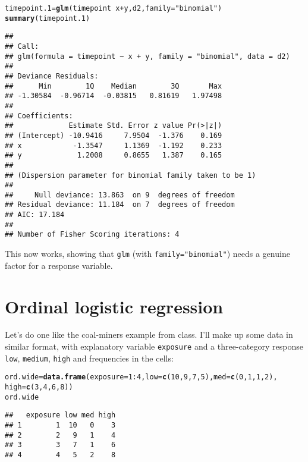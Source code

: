 \documentclass{article}\usepackage[]{graphicx}\usepackage[]{color}
\makeatletter
\newcommand{\hlnum}[1]{\textcolor[rgb]{0.686,0.059,0.569}{#1}}%
\newcommand{\hlstr}[1]{\textcolor[rgb]{0.192,0.494,0.8}{#1}}%
\newcommand{\hlopt}[1]{\textcolor[rgb]{0,0,0}{#1}}%
\newcommand{\hlstd}[1]{\textcolor[rgb]{0.345,0.345,0.345}{#1}}%
\newcommand{\hlkwb}[1]{\textcolor[rgb]{0.69,0.353,0.396}{#1}}%
\newcommand{\hlkwc}[1]{\textcolor[rgb]{0.333,0.667,0.333}{#1}}%
\newcommand{\hlkwd}[1]{\textcolor[rgb]{0.737,0.353,0.396}{\textbf{#1}}}%
\newenvironment{kframe}{%
 \def\at@end@of@kframe{}%
 \ifinner\ifhmode%
  \def\at@end@of@kframe{\end{minipage}}%
  \begin{minipage}{\columnwidth}%
 \fi\fi%
 \def\FrameCommand##1{\hskip\@totalleftmargin \hskip-\fboxsep
 \colorbox{shadecolor}{##1}\hskip-\fboxsep
     \hskip-\linewidth \hskip-\@totalleftmargin \hskip\columnwidth}%
 \MakeFramed {\advance\hsize-\width
   \@totalleftmargin\z@ \linewidth\hsize
   \@setminipage}}%
 {\par\unskip\endMakeFramed%
 \at@end@of@kframe}
\newenvironment{knitrout}{}{} %
\makeatother
\begin{document}
\begin{knitrout}
\color{fgcolor}\begin{kframe}
\begin{alltt}
\hlstd{timepoint.1}\hlkwb{=}\hlkwd{glm}\hlstd{(timepoint}\hlopt{~}\hlstd{x}\hlopt{+}\hlstd{y,d2,}\hlkwc{family}\hlstd{=}\hlstr{"binomial"}\hlstd{)}
\hlkwd{summary}\hlstd{(timepoint.1)}
\end{alltt}
\begin{verbatim}
## 
## Call:
## glm(formula = timepoint ~ x + y, family = "binomial", data = d2)
## 
## Deviance Residuals: 
##      Min        1Q    Median        3Q       Max  
## -1.30584  -0.96714  -0.03815   0.81619   1.97498  
## 
## Coefficients:
##             Estimate Std. Error z value Pr(>|z|)
## (Intercept) -10.9416     7.9504  -1.376    0.169
## x            -1.3547     1.1369  -1.192    0.233
## y             1.2008     0.8655   1.387    0.165
## 
## (Dispersion parameter for binomial family taken to be 1)
## 
##     Null deviance: 13.863  on 9  degrees of freedom
## Residual deviance: 11.184  on 7  degrees of freedom
## AIC: 17.184
## 
## Number of Fisher Scoring iterations: 4
\end{verbatim}
\end{kframe}
\end{knitrout}

This now works, showing that \texttt{glm} (with
\texttt{family="binomial"}) needs a genuine factor for a response variable.

\section{Ordinal logistic regression}

Let's do one like the coal-miners example from class. I'll make up
some data in similar format, with explanatory variable
\texttt{exposure} and a three-category response \texttt{low},
\texttt{medium}, \texttt{high} and frequencies in the cells:

\begin{knitrout}
\color{fgcolor}\begin{kframe}
\begin{alltt}
\hlstd{ord.wide}\hlkwb{=}\hlkwd{data.frame}\hlstd{(}\hlkwc{exposure}\hlstd{=}\hlnum{1}\hlopt{:}\hlnum{4}\hlstd{,}\hlkwc{low}\hlstd{=}\hlkwd{c}\hlstd{(}\hlnum{10}\hlstd{,}\hlnum{9}\hlstd{,}\hlnum{7}\hlstd{,}\hlnum{5}\hlstd{),}\hlkwc{med}\hlstd{=}\hlkwd{c}\hlstd{(}\hlnum{0}\hlstd{,}\hlnum{1}\hlstd{,}\hlnum{1}\hlstd{,}\hlnum{2}\hlstd{),}
  \hlkwc{high}\hlstd{=}\hlkwd{c}\hlstd{(}\hlnum{3}\hlstd{,}\hlnum{4}\hlstd{,}\hlnum{6}\hlstd{,}\hlnum{8}\hlstd{))}
\hlstd{ord.wide}
\end{alltt}
\begin{verbatim}
##   exposure low med high
## 1        1  10   0    3
## 2        2   9   1    4
## 3        3   7   1    6
## 4        4   5   2    8
\end{verbatim}
\end{kframe}
\end{knitrout}
\end{document}
